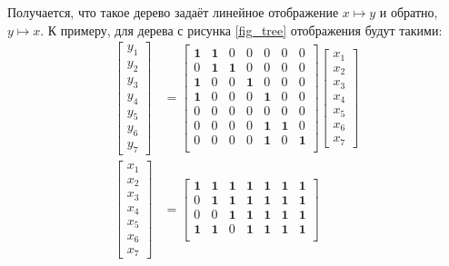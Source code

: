 \documentclass[oneside, a4paper]{article}
\theoremstyle{plain}
\theoremstyle{remark}
\begin{document}
Получается, что такое дерево задаёт линейное отображение $x \mapsto y$ и
обратно, $y \mapsto x$. К примеру, для дерева с рисунка \ref{fig_tree}
отображения будут такими:
\[
\begin{aligned}
\begin{bmatrix}
y_1 \\ y_2 \\ y_3 \\ y_4 \\ y_5 \\ y_6 \\ y_7
\end{bmatrix} &= \begin{bmatrix}
\mathbf1 & \mathbf1 & 0 & 0 & 0 & 0 & 0 \\
0 & \mathbf1 & \mathbf1 & 0 & 0 & 0 & 0 \\
\mathbf1 & 0 & 0 & \mathbf1 & 0 & 0 & 0 \\
\mathbf1 & 0 & 0 & 0 & \mathbf1 & 0 & 0 \\
0 & 0 & 0 & 0 & 0 & 0 & 0 \\
0 & 0 & 0 & 0 & \mathbf1 & \mathbf1 & 0 \\
0 & 0 & 0 & 0 & \mathbf1 & 0 & \mathbf1 \\
\end{bmatrix} \begin{bmatrix}
x_1 \\ x_2 \\ x_3 \\ x_4 \\ x_5 \\ x_6 \\ x_7
\end{bmatrix}
\\
\begin{bmatrix}
x_1 \\ x_2 \\ x_3 \\ x_4 \\ x_5 \\ x_6 \\ x_7
\end{bmatrix} &= \begin{bmatrix}
\mathbf 1 & \mathbf 1 & \mathbf 1 & \mathbf 1 & \mathbf 1 & \mathbf 1 & \mathbf 1 \\
0 & \mathbf 1 & \mathbf 1 & \mathbf 1 & \mathbf 1 & \mathbf 1 & \mathbf 1 \\
0 & 0 & \mathbf 1 & \mathbf 1 & \mathbf 1 & \mathbf 1 & \mathbf 1 \\
\mathbf 1 & \mathbf 1 & 0 & \mathbf 1 & \mathbf 1 & \mathbf 1 & \mathbf 1 \\

\end{bmatrix}
\end{aligned}\]
\end{document}
